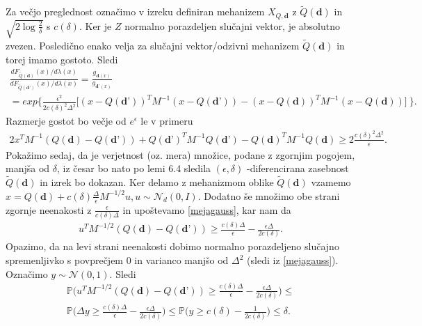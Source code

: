 \documentclass[12pt,a4paper]{amsart}
\theoremstyle{definition} %
\theoremstyle{plain} %
\begin{document}
Za večjo preglednost označimo v izreku definiran mehanizem $X_{Q, \textbf{d}}$ z $\tilde{Q}(\textbf{d})$ in  $\sqrt{2\log{\frac{2}{\delta}}}$ s $c(\delta)$. Ker je $Z$ normalno porazdeljen slučajni vektor, je absolutno zvezen. Posledično enako velja za slučajni vektor/odzivni mehanizem $\tilde{Q}(\textbf{d})$ in torej imamo gostoto. Sledi
\begin{gather*}
\frac{dF_{\tilde{Q}(\textbf{d})}(x)/d \lambda (x)}{dF_{\tilde{Q}(\textbf{d'})}(x)/d \lambda (x)} = \frac{g_{\textbf{d} (x)}}{g_{\textbf{d'} (x)}} \\ 
=  exp \bigg\{ \frac{\epsilon^2}{2c(\delta)^2 \Delta^2} \Big[ (x-Q(\textbf{d'}))^T M^{-1} (x-Q(\textbf{d'})) - (x-Q(\textbf{d}))^T M^{-1} (x-Q(\textbf{d}))\Big]\ \bigg\}.
\end{gather*}
Razmerje gostot bo večje od $e^{\epsilon}$ le v primeru
\begin{gather*}
2x^T M^{-1}(Q(\textbf{d})-Q(\textbf{d'})) + Q(\textbf{d'})^T M^{-1} Q(\textbf{d'}) - Q(\textbf{d})^T M^{-1} Q(\textbf{d}) \geq 2 \frac{c(\delta)^2 \Delta^2}{\epsilon}.
\end{gather*}
Pokažimo sedaj, da je verjetnost (oz. mera) množice, podane z zgornjim pogojem, manjša od $\delta$, iz česar bo nato po lemi 6.4 sledila $(\epsilon, \delta)$ -diferencirana zasebnost $\tilde{Q}(\textbf{d})$ in izrek bo dokazan.
\newline
\newline
Ker delamo z mehanizmom oblike $\tilde{Q}(\textbf{d})$ vzamemo $x = Q(\textbf{d}) + c(\delta) \frac{\Delta}{\epsilon} M^{-1/2}u, u \sim \mathcal{N}_d (0,I)$. Dodatno še množimo obe strani zgornje neenakosti z $\frac{\epsilon}{c(\delta)\Delta}$ in upoštevamo \eqref{mejagauss}, kar nam da
\begin{gather*}
u^T M^{-1/2}(Q(\textbf{d})-Q(\textbf{d'})) \geq \frac{c(\delta)\Delta}{\epsilon} - \frac{\epsilon \Delta}{2 c(\delta)}.
\end{gather*}
Opazimo, da na levi strani neenakosti dobimo normalno porazdeljeno slučajno spremenljivko s povprečjem 0 in varianco manjšo od $\Delta^2$ (sledi iz \eqref{mejagauss}). Označimo $y \sim \mathcal{N}(0,1)$. Sledi 
\begin{gather*}
\mathbb{P}\Big(u^T M^{-1/2}(Q(\textbf{d})-Q(\textbf{d'})) \geq \frac{c(\delta)\Delta}{\epsilon} - \frac{\epsilon \Delta}{2 c(\delta)}\Big) \leq \\
\mathbb{P}\Big(\Delta y \geq \frac{c(\delta)\Delta}{\epsilon} - \frac{\epsilon \Delta}{2 c(\delta)}\Big) \leq \mathbb{P}\Big(y \geq c(\delta) - \frac{1}{2 c(\delta)}\Big) \leq \delta.
\end{gather*}
\end{document}
